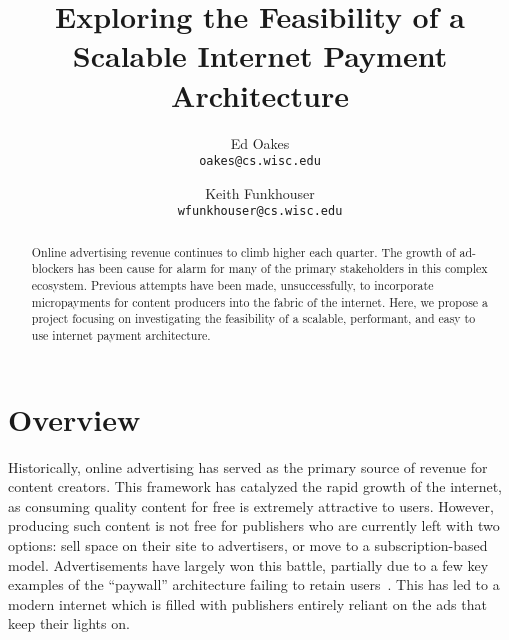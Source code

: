 \documentclass[letterpaper,twocolumn,10pt]{article}
\begin{document}
\date{}

\title{\Large \bf Exploring the Feasibility of a Scalable Internet Payment Architecture}

\author{
{\rm Ed Oakes} \\
{\rm \texttt{oakes@cs.wisc.edu}}
\and
{\rm Keith Funkhouser} \\
{\rm \texttt{wfunkhouser@cs.wisc.edu}}
}

\maketitle


\begin{abstract}
Online advertising revenue continues to climb higher each quarter. 
The growth of ad-blockers has been cause for alarm for many of the 
primary stakeholders in this complex ecosystem. Previous attempts 
have been made, unsuccessfully, to incorporate micropayments for 
content producers into the fabric of the internet. Here, we propose 
a project focusing on investigating the feasibility of a scalable, 
performant, and easy to use internet payment architecture.
\end{abstract}


\section{Overview}
Historically, online advertising has served as the primary source of
revenue for content creators. This framework has catalyzed the rapid
growth of the internet, as consuming quality content for free is
extremely attractive to users. However, producing such content is not
free for publishers who are currently left with two options: sell
space on their site to advertisers, or move to a subscription-based
model. Advertisements have largely won this battle, partially due to a
few key examples of the “paywall” architecture failing to retain
users~\cite{nyt}. This has led to a modern internet which is filled
with publishers entirely reliant on the ads that keep their lights on.
\end{document}
